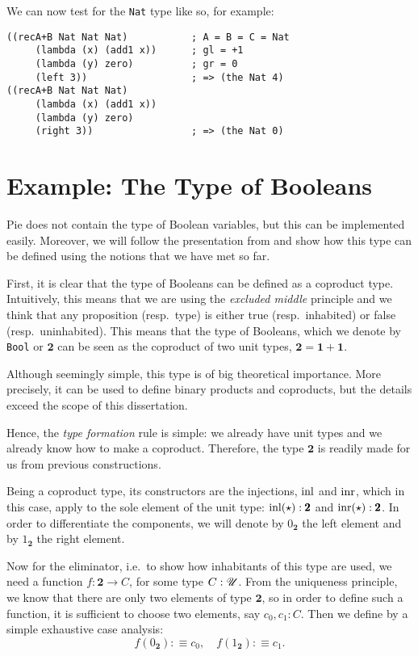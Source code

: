 We can now test for the \texttt{Nat} type like so, for example:
{
  \small
\begin{verbatim}
((recA+B Nat Nat Nat)           ; A = B = C = Nat
     (lambda (x) (add1 x))      ; gl = +1
     (lambda (y) zero)          ; gr = 0
     (left 3))                  ; => (the Nat 4)
((recA+B Nat Nat Nat)
     (lambda (x) (add1 x))
     (lambda (y) zero)
     (right 3))                 ; => (the Nat 0)
\end{verbatim}
}

\section{Example: The Type of Booleans}

Pie does not contain the type of Boolean variables, but this can
be implemented easily. Moreover, we will follow the presentation from
\cite[\S1.8]{hott} and show how this type can be defined using the notions
that we have met so far.

First, it is clear that the type of Booleans can be defined as a coproduct
type. Intuitively, this means that we are using the \emph{excluded middle}
principle and we think that any proposition (resp.\ type) is either true
(resp.\ inhabited) or false (resp.\ uninhabited). This means that the type
of Booleans, which we denote by \texttt{Bool} or $ \pmb{2} $ can be seen as
the coproduct of two unit types, $ \pmb{2} = \pmb{1} + \pmb{1} $.

Although seemingly simple, this type is of big theoretical importance. More
precisely, it can be used to define binary products and coproducts, but the
details exceed the scope of this dissertation.

Hence, the \emph{type formation} rule is simple: we already have unit types
and we already know how to make a coproduct. Therefore, the type $ \pmb{2} $
is readily made for us from previous constructions.

Being a coproduct type, its constructors are the injections, $ \mathrm{inl} $
and $ \mathrm{inr} $, which in this case, apply to the sole element of the
unit type: $ \mathrm{inl}(\star) : \pmb{2} $ and $ \mathrm{inr}(\star) : \pmb{2} $.
In order to differentiate the components, we will denote by $ 0_{\pmb{2}} $
the left element and by $ 1_{\pmb{2}} $ the right element.

Now for the eliminator, i.e.\ to show how inhabitants of this type are
used, we need a function $ f : \pmb{2} \to C $, for some type $ C : \mathscr{U} $.
From the uniqueness principle, we know that there are only two elements of
type $ \pmb{2} $, so in order to define such a function, it is sufficient to
choose two elements, say $ c_0, c_1 : C $. Then we define by a simple exhaustive
case analysis:
\[
  f(0_{\pmb{2}}) :\equiv c_0, \quad f(1_{\pmb{2}}) :\equiv c_1.
\]

